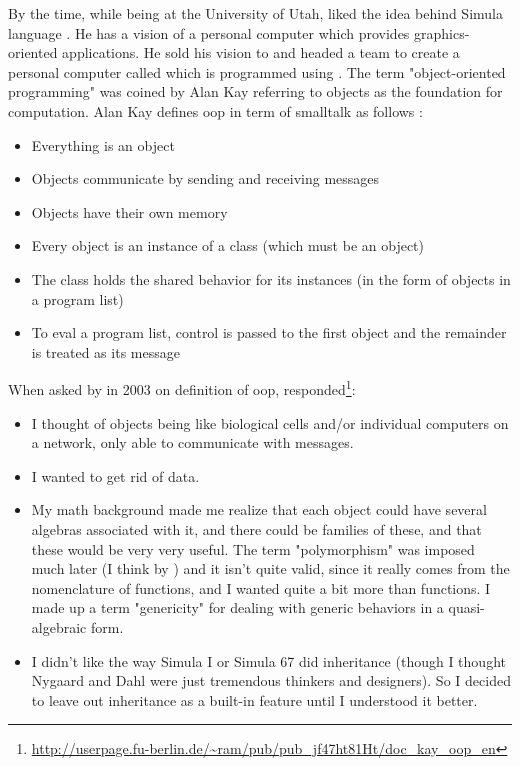 \documentclass[12pt]{book}
\begin{document}
By the time, while being at the University of Utah,  liked the idea behind Simula language \citep{2004-huang}. 
He has a vision of a personal computer which provides graphics-oriented applications. 
He sold his vision to  and headed a team to create a personal computer called  which is programmed using .
The term "object-oriented programming" was coined by Alan Kay referring to objects as the foundation for computation.
Alan Kay defines \ac{oop} in term of smalltalk as follows \citep{1993-kay,2014-cunningham}:
\begin{itemize}
	\item Everything is an object
	\item Objects communicate by sending and receiving messages
	\item Objects have their own memory 
	\item Every object is an instance of a class (which must be an object)
	\item The class holds the shared behavior for its instances (in the form of objects in a program list)
	\item To eval a program list, control is passed to the first object and the remainder is treated as its message
\end{itemize}
When asked by  in 2003 on definition of \ac{oop},  responded\footnote{\url{http://userpage.fu-berlin.de/~ram/pub/pub_jf47ht81Ht/doc_kay_oop_en}}:
\begin{itemize}
	\item I thought of objects being like biological cells and/or individual computers on a network, only able to communicate with messages.
	\item I wanted to get rid of data.
	\item My math background made me realize that each object could have several algebras associated with it, and there could be families of these, and that these would be very very useful. 
	The term "polymorphism" was imposed much later (I think by ) and it isn't quite valid, since it really comes from the nomenclature of functions, and I wanted quite a bit more than functions. 
	I made up a term "genericity" for dealing with generic behaviors in a quasi-algebraic form.
	\item I didn't like the way Simula I or Simula 67 did inheritance (though I thought Nygaard and Dahl were just tremendous thinkers and designers). So I decided to leave out inheritance as a built-in feature until I understood it better.
\end{itemize}
\end{document}
